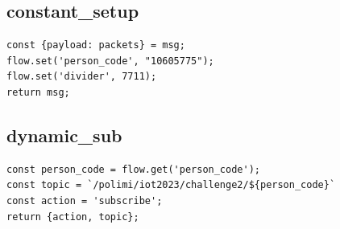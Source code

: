 \documentclass[12pt,a4paper]{article}
\begin{document}
\subsection*{constant\_setup}
\begin{verbatim}
const {payload: packets} = msg;
flow.set('person_code', "10605775");
flow.set('divider', 7711);
return msg;
\end{verbatim}

\subsection*{dynamic\_sub}
\begin{verbatim}
const person_code = flow.get('person_code');
const topic = `/polimi/iot2023/challenge2/${person_code}`
const action = 'subscribe';
return {action, topic};
\end{verbatim}
\end{document}
